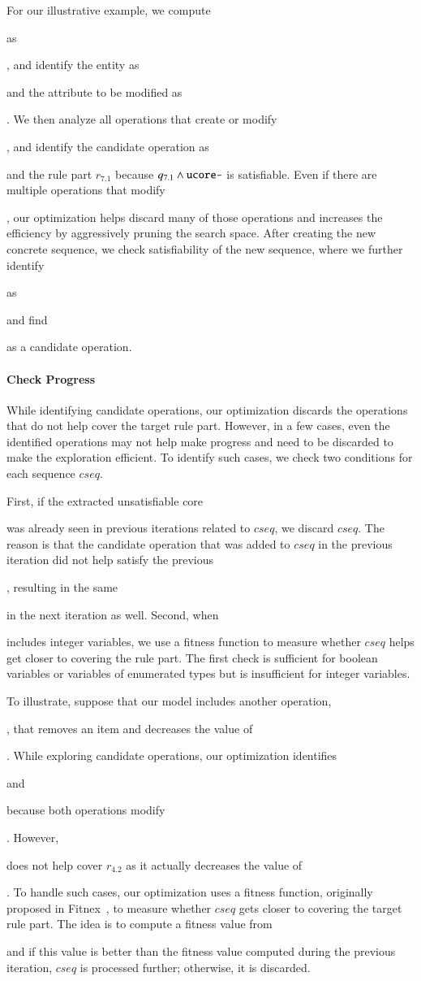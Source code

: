 For our illustrative example, we compute \subject{ucore-} as \subject{ord.total
  > 0}, and identify the entity as \subject{Order} and the attribute to be
modified as \subject{total}. We then analyze all operations that create or
modify \subject{Order}, and identify the candidate operation as
\subject{AddItemToOrder} and the rule part $r_{7.1}$ because $q_{7.1} \wedge
\subject{ucore-}$ is satisfiable. Even if there are multiple operations that
modify \subject{Order}, our optimization helps discard many of those operations
and increases the efficiency by aggressively pruning the search space.  After
creating the new concrete sequence, we check satisfiability of the new sequence,
where we further identify \subject{ucore} as \subject{cust.crLimit = 0 $\wedge$
  cust.crLimit > 0} and find \subject{AddCreditLimit} as a candidate operation.

\paragraph*{Check Progress} While identifying candidate operations, our
optimization discards the operations that do not help cover the target rule
part. However, in a few cases, even the identified operations may not help make
progress and need to be discarded to make the exploration efficient. To identify
such cases, we check two conditions for each sequence $cseq$.

First, if the extracted unsatisfiable core \subject{ucore} was already seen in
previous iterations related to $cseq$, we discard $cseq$. The reason is that the
candidate operation that was added to $cseq$ in the previous iteration did not
help satisfy the previous \subject{ucore}, resulting in the same \subject{ucore}
in the next iteration as well.  Second, when \subject{ucore} includes integer
variables, we use a fitness function to measure whether $cseq$ helps get closer
to covering the rule part. The first check is sufficient for boolean variables
or variables of enumerated types but is insufficient for integer variables.

To illustrate, suppose that our model includes another operation,
\subject{RemoveItemFromOrder}, that removes an item and decreases the value of
\subject{Order.total}. While exploring candidate operations, our optimization
identifies \subject{AddItemToOrder} and \subject{RemoveItemFromOrder} because
both operations modify \subject{total}. However, \subject{RemoveItemFromOrder}
does not help cover $r_{4.2}$ as it actually decreases the value of
\subject{total}. To handle such cases, our optimization uses a fitness function,
originally proposed in Fitnex~\cite{xie09:fitness}, to measure whether $cseq$
gets closer to covering the target rule part. The idea is to compute a fitness
value from \subject{ucore} and if this value is better than the fitness value
computed during the previous iteration, $cseq$ is processed further; otherwise,
it is discarded.

